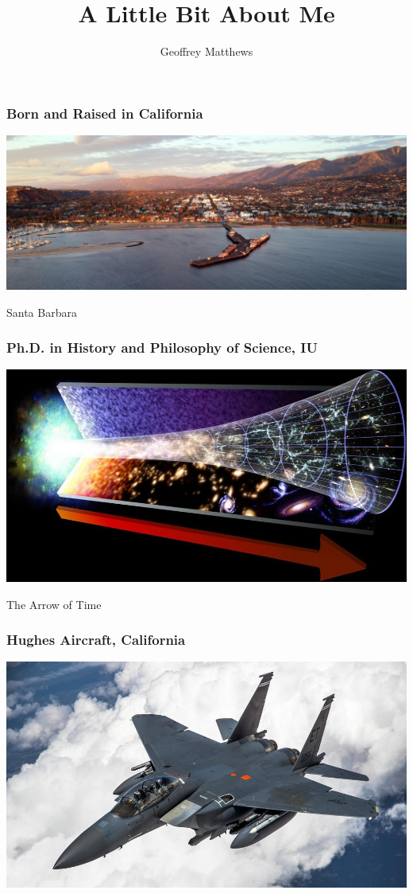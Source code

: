 \documentclass{beamer}
\title{A Little Bit About Me}
\author{Geoffrey Matthews}
\institute{Washington and Lee University}
\begin{document}
\frame{\titlepage}

\begin{frame}
\frametitle{Born and Raised in California}
\includegraphics[width=\textwidth]{santabarbara}
\centerline{Santa Barbara}
\end{frame}
\begin{frame}
\frametitle{Ph.D. in History and Philosophy of Science, IU}
\includegraphics[width=\textwidth]{arrowoftime}
\centerline{The Arrow of Time}
\end{frame}

\begin{frame}
\frametitle{Hughes Aircraft, California}
\includegraphics[width=\textwidth]{f15}
\end{frame}
\end{document}

